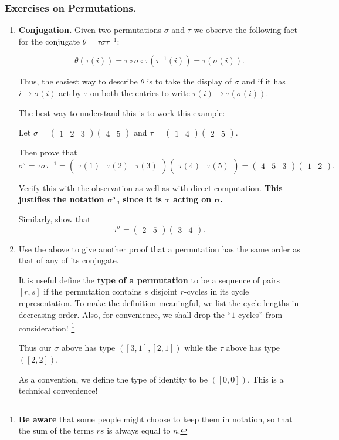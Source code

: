 \documentclass[12pt]{article}
\newcommand{\matr}[2]{\left( \begin{array}{*{#1}{r}}#2\end{array}\right)}
\begin{document}
\subsubsection{Exercises on Permutations.}
\begin{enumerate}
\item {\bf Conjugation.} Given two permutations $\sigma$ and $\tau$ we
observe the following fact for the
conjugate
$\theta = \tau \sigma  \tau^{-1}$:

$$\theta(\tau(i))= \tau \circ \sigma\circ \tau(\tau^{-1}(i))= \tau(\sigma(i)).$$

Thus, the easiest way to describe $\theta$ is to take the display of
$\sigma$ and if it has $i\rightarrow \sigma(i)$ act by $\tau$ on both
the entries to write $\tau(i) \rightarrow \tau(\sigma(i))$.

The best way to understand this is to work this example:

Let $\sigma=\matr{3}{1 & 2 & 3} \matr{2}{4 & 5}$ and $\tau =
\matr{2}{1 & 4}\matr{2}{2 & 5}$.

Then prove that 
$$\sigma^{\tau} = \tau \sigma \tau^{-1} = 
\matr{3}{\tau(1) & \tau(2) & \tau(3)} \matr{2}{\tau(4) & \tau(5)} 
= \matr{3}{4 & 5 & 3} \matr{2}{1 & 2}.$$

Verify this with the observation as well as with direct computation.
{\bf This justifies the notation $\mathbf{\sigma^{\tau}}$, since it is 
$\mathbf{\tau}$ acting on $\mathbf{\sigma}$.}

Similarly, show that 
$$\tau^\sigma = \matr{2}{2 & 5} \matr{2}{3 & 4}.$$

\item Use the above to give another proof that a permutation has the
same order as that of any of its conjugate.

It is useful define the {\bf type of a
permutation}
to be a sequence of pairs $[r,s]$ if the permutation contains $s$ disjoint
$r$-cycles in its cycle representation. To make the definition
meaningful, we list the cycle lengths in decreasing order. Also, for
convenience, we shall drop the ``$1$-cycles'' from consideration!
\footnote{{\bf Be aware} that some people might choose to keep them in notation, so that
the sum of the terms $rs$ is always equal to $n$.}

Thus our $\sigma$ above has type $([3,1],[2,1])$ while the $\tau$ above  
has type $([2,2])$.

As a convention, we define the type of identity to be $([0,0])$.
This is a technical convenience!


\end{enumerate}
\end{document}
